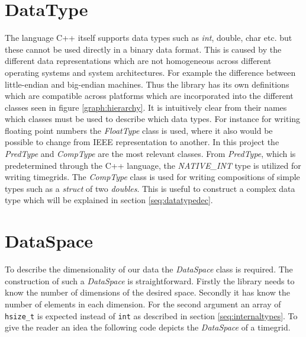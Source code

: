 \section{DataType}
\label{seq:datatype}
The language C++ itself supports data types such as \emph{int}, double, char etc. but these cannot be used directly in a binary data format.
This is caused by the different data representations which are not homogeneous across different operating systems and system architectures. For example the difference between little-endian and big-endian machines. Thus the library has its own definitions which are compatible across platforms which are incorporated into the different classes seen in figure \ref{graph:hierarchy}. It is intuitively clear from their names which classes must be used to describe which data types. For instance for writing floating point numbers the \textit{FloatType} class is used, where it also would be possible to change from IEEE representation to another. In this project the \textit{PredType} and \textit{CompType} are the most relevant classes. From \textit{PredType}, which is predetermined through the C++ language, the \textit{NATIVE\_INT} type is utilized for writing timegrids. The \textit{CompType} class is used for
writing compositions of simple types such as a \textit{struct} of two \textit{doubles}. This is useful to construct a complex data type which will be explained in section \ref{seq:datatypedec}.

\section{DataSpace}
\label{seq:dataspace}
To describe the dimensionality of our data the \textit{DataSpace} class is required. The construction of such a \textit{DataSpace} is straightforward. Firstly the library needs to know the number of dimensions of the desired space. Secondly it has know the number of elements in each dimension. For the second argument an array of \texttt{hsize\_t} is expected instead of \texttt{int} as described in section \ref{seq:internaltypes}. To give the reader an idea the following code depicts the \textit{DataSpace} of a timegrid.

